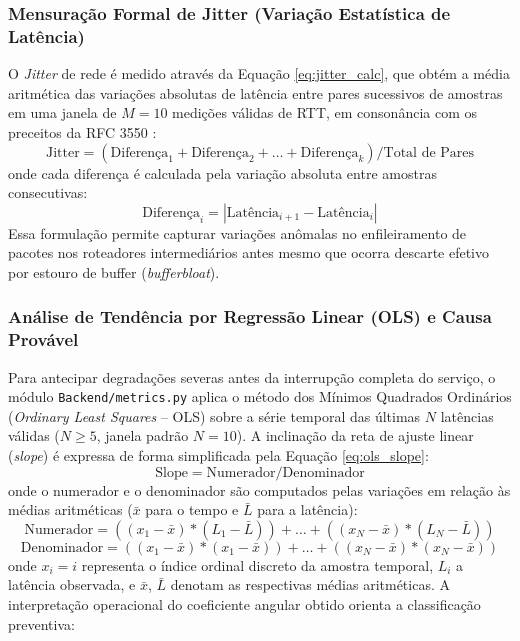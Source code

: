 \documentclass[12pt,a4paper]{article}
\begin{document}
\subsubsection{Mensuração Formal de Jitter (Variação Estatística de Latência)}
O \textit{Jitter} de rede é medido através da Equação \ref{eq:jitter_calc}, que obtém a média aritmética das variações absolutas de latência entre pares sucessivos de amostras em uma janela de $M = 10$ medições válidas de RTT, em consonância com os preceitos da RFC 3550 \cite{schulzrinne2003rfc3550}:
\begin{equation}
\label{eq:jitter_calc}
\text{Jitter} = (\text{Diferença}_1 + \text{Diferença}_2 + \dots + \text{Diferença}_k) / \text{Total de Pares}
\end{equation}
onde cada diferença é calculada pela variação absoluta entre amostras consecutivas:
\begin{equation*}
\text{Diferença}_i = |\text{Latência}_{i+1} - \text{Latência}_i|
\end{equation*}
Essa formulação permite capturar variações anômalas no enfileiramento de pacotes nos roteadores intermediários antes mesmo que ocorra descarte efetivo por estouro de buffer (\textit{bufferbloat}).

\subsubsection{Análise de Tendência por Regressão Linear (OLS) e Causa Provável}
Para antecipar degradações severas antes da interrupção completa do serviço, o módulo \texttt{Backend/metrics.py} aplica o método dos Mínimos Quadrados Ordinários (\textit{Ordinary Least Squares} -- OLS) sobre a série temporal das últimas $N$ latências válidas ($N \ge 5$, janela padrão $N = 10$). A inclinação da reta de ajuste linear (\textit{slope}) é expressa de forma simplificada pela Equação \ref{eq:ols_slope}:
\begin{equation}
\label{eq:ols_slope}
\text{Slope} = \text{Numerador} / \text{Denominador}
\end{equation}
onde o numerador e o denominador são computados pelas variações em relação às médias aritméticas ($\bar{x}$ para o tempo e $\bar{L}$ para a latência):
\begin{equation*}
\text{Numerador} = ((x_1 - \bar{x}) * (L_1 - \bar{L})) + \dots + ((x_N - \bar{x}) * (L_N - \bar{L}))
\end{equation*}
\begin{equation*}
\text{Denominador} = ((x_1 - \bar{x}) * (x_1 - \bar{x})) + \dots + ((x_N - \bar{x}) * (x_N - \bar{x}))
\end{equation*}
onde $x_i = i$ representa o índice ordinal discreto da amostra temporal, $L_i$ a latência observada, e $\bar{x}$, $\bar{L}$ denotam as respectivas médias aritméticas. A interpretação operacional do coeficiente angular obtido orienta a classificação preventiva:
\end{document}

